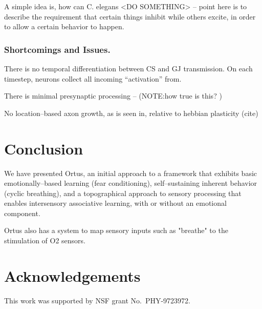 \documentclass[letterpaper]{article}
\begin{document}
A simple idea is, how can C. elegans <DO SOMETHING> -- point here is to describe the requirement that certain things inhibit while others excite, in order to allow a certain behavior to happen.

\subsubsection{Shortcomings and Issues.}
There is no temporal differentiation between CS and GJ transmission. On each timestep, neurons collect all incoming ``activation'' from.

There is minimal presynaptic processing -- (NOTE:how true is this? )

No location--based axon growth, as is seen in, relative to hebbian plasticity (cite)





\section{Conclusion}
We have presented Ortus, an initial approach to a framework that exhibits basic emotionally--based learning (fear conditioning), self--sustaining inherent behavior (cyclic breathing), and a topographical approach to sensory processing that enables intersensory associative learning, with or without an emotional component.

Ortus also has a system to map sensory inputs such as "breathe" to the stimulation of O2 sensors.






\section{Acknowledgements}

This work was supported by NSF grant No.\ PHY-9723972.

\footnotesize

\end{document}
